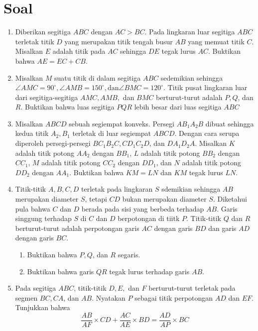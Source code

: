 \documentclass[12pt]{scrartcl}
\begin{document}
	\section{Soal}
	\begin{enumerate}
		\item
		Diberikan segitiga $ABC$ dengan $AC>BC$. Pada lingkaran luar segitiga $ABC$ terletak titik $D$ yang merupakan titik tengah busur $AB$ yang memuat titik $C$. Misalkan $E$ adalah titik pada $AC$ sehingga $DE$ tegak lurus $AC$. Buktikan bahwa $AE=EC+CB$.
		
		\item
		Misalkan $M$ suatu titik di dalam segitiga $ABC$ sedemikian sehingga $\angle AMC = 90 ^{\circ}, \angle AMB = 150 ^{\circ}, \text{dan} \angle BMC = 120 ^\circ$. Titik pusat lingkaran luar dari segitiga-segitiga $AMC, AMB,$ dan $ BMC$ berturut-turut adalah $P,Q$, dan $R$. Buktikan bahwa luas segitiga $PQR$ lebih besar dari luas segitiga $ABC$
		
		\item
		Misalkan $ABCD$ sebuah segiempat konveks. Persegi $AB_1A_2B$ dibuat sehingga kedua titik $A_2,B_1$ terletak di luar segiempat $ABCD$. Dengan cara serupa diperoleh persegi-persegi $BC_1B_2C, CD_1C_2D$, dan $DA_1D_2A$. Misalkan $K$ adalah titik potong $AA_2$ dengan $BB_1$, $L$ adalah titik potong $BB_2$ dengan $CC_1$, $M$ adalah titik potong $CC_2$ dengan $DD_1$, dan $N$ adalah titik potong $DD_2$ dengan $AA_1$. Buktikan bahwa $KM = LN$ dan $KM$ tegak lurus $LN$.
		
		\item
		Titik-titik $A,B,C,D$ terletak pada lingkaran $S$ sdemikian sehingga $AB$ merupakan diameter $S$, tetapi $CD$ bukan merupakan diameter $S$. Diketahui pula bahwa $C$ dan $D$ berada pada sisi yang berbeda terhadap $AB$. Garis singgung terhadap $S$ di $C$ dan $D$ berpotongan di tiitk $P$. Titik-titik $Q$ dan $R$ berturut-turut adalah perpotongan garis $AC$ dengan garis $BD$ dan garis $AD$ dengan garis $BC$.
		\begin{enumerate}
			\item[a.] 
			Buktikan bahwa $P,Q$, dan $R$ segaris.
			\item[b.]
			Buktikan bahwa garis $QR$ tegak lurus terhadap garis $AB$.
		\end{enumerate}
	
		\item
		Pada segitiga $ABC$, titik-titik $D,E,$ dan $F$ berturut-turut terletak pada segmen $BC,CA$, dan $AB$. Nyatakan $P$ sebagai titik perpotongan $AD$ dan $EF$. Tunjukkan bahwa $$\frac{AB}{AF}\times CD + \frac{AC}{AE}\times BD = \frac{AD}{AP} \times BC$$
		

\end{enumerate}
\end{document}

